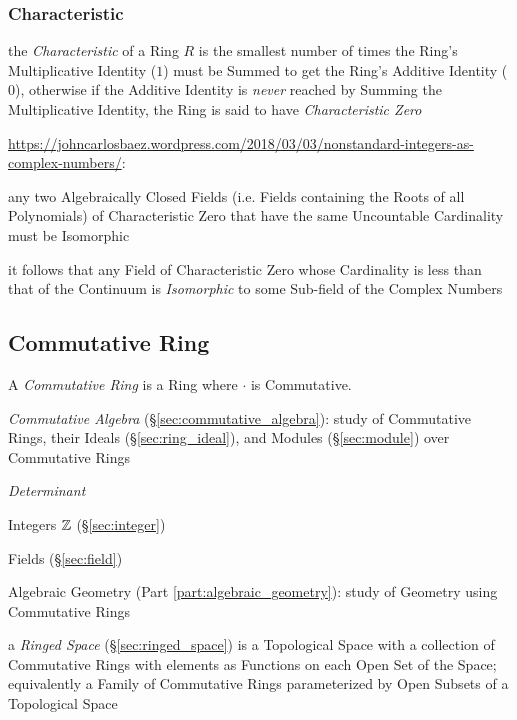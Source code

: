 \subsubsection{Characteristic}\label{sec:ring_characteristic}

the \emph{Characteristic} of a Ring $R$ is the smallest number of times the
Ring's Multiplicative Identity ($1$) must be Summed to get the Ring's Additive
Identity ($0$), otherwise if the Additive Identity is \emph{never} reached by
Summing the Multiplicative Identity, the Ring is said to have
\emph{Characteristic Zero}

\url{https://johncarlosbaez.wordpress.com/2018/03/03/nonstandard-integers-as-complex-numbers/}:

any two Algebraically Closed Fields (i.e. Fields containing the Roots of all
Polynomials) of Characteristic Zero that have the same Uncountable Cardinality
must be Isomorphic

it follows that any Field of Characteristic Zero whose Cardinality is less than
that of the Continuum is \emph{Isomorphic} to some Sub-field of the Complex
Numbers



\subsection{Commutative Ring}\label{sec:commutative_ring}

A \emph{Commutative Ring} is a Ring where $\cdot$ is Commutative.

\fist \emph{Commutative Algebra} (\S\ref{sec:commutative_algebra}): study of
Commutative Rings, their Ideals (\S\ref{sec:ring_ideal}), and Modules
(\S\ref{sec:module}) over Commutative Rings

\emph{Determinant}

Integers $\mathbb{Z}$ (\S\ref{sec:integer})

Fields (\S\ref{sec:field})

Algebraic Geometry (Part \ref{part:algebraic_geometry}): study of
Geometry using Commutative Rings

\fist a \emph{Ringed Space} (\S\ref{sec:ringed_space}) is a Topological Space
with a collection of Commutative Rings with elements as Functions on each Open
Set of the Space; equivalently a Family of Commutative Rings parameterized by
Open Subsets of a Topological Space


